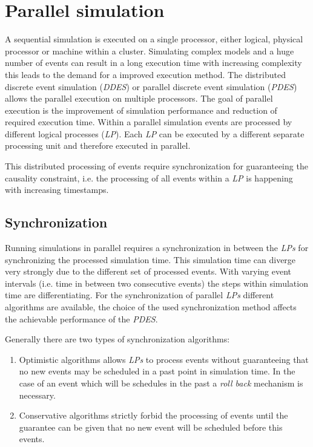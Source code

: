 \chapter{Parallel simulation}
\label{cha:parallel_sim}
A sequential simulation is executed on a single processor, either logical, physical processor or machine within a cluster.
Simulating complex models and a huge number of events can result in a long execution time with increasing complexity this leads to the demand for a improved execution method.
The distributed discrete event simulation (\emph{DDES}) or parallel discrete event simulation (\emph{PDES}) allows the parallel execution on multiple processors.
The goal of parallel execution is the improvement of simulation performance and reduction of required execution time.
Within a parallel simulation events are processed by different logical processes (\emph{LP}).
Each \emph{LP} can be executed by a different separate processing unit and therefore executed in parallel. \cite{bagrodia_parsec_1998}

This distributed processing of events require synchronization for guaranteeing the causality constraint, i.e. the processing of all events within a \emph{LP} is happening with increasing timestamps.

\section{Synchronization}
\label{sec:parallel_synchronization}
Running simulations in parallel requires a synchronization in between the \emph{LPs} for synchronizing the processed simulation time.
This simulation time can diverge very strongly due to the different set of processed events.
With varying event intervals (i.e. time in between two consecutive events) the steps within simulation time are differentiating.
For the synchronization of parallel \emph{LPs} different algorithms are available, the choice of the used synchronization method affects the achievable performance of the \emph{PDES}. \cite[chapter 2]{bagrodia_performance_2000}

Generally there are two types of synchronization algorithms:

\begin{enumerate}
    \item Optimistic algorithms allows \emph{LPs} to process events without guaranteeing that no new events may be scheduled in a past point in simulation time.
    In the case of an event which will be schedules in the past a \emph{roll back} mechanism is necessary.
    \item Conservative algorithms strictly forbid the processing of events until the guarantee can be given that no new event will be scheduled before this events.
\end{enumerate}


